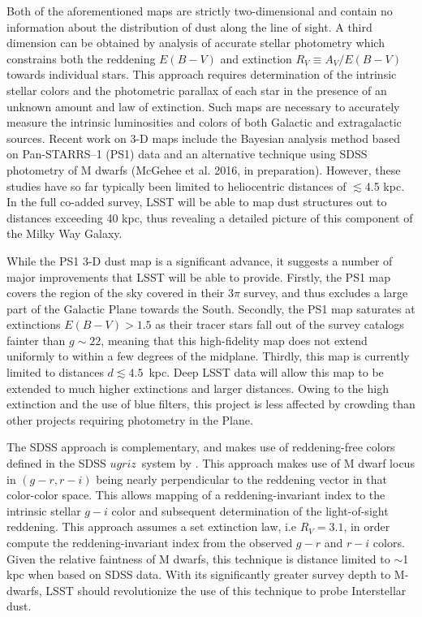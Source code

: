 Both of the aforementioned maps are strictly two-dimensional and
contain no information about the distribution of dust along the line
of sight. A third dimension can be obtained by analysis of accurate
stellar photometry which constrains both the reddening $E(B-V)$ and
extinction $R_V \equiv A_V/E(B-V)$ towards individual stars. This
approach requires determination of the intrinsic stellar colors and
the photometric parallax of each star in the presence of an unknown
amount and law of extinction. Such maps are necessary to accurately
measure the intrinsic luminosities and colors of both Galactic and
extragalactic sources. Recent work on 3-D maps include the
  Bayesian analysis method based on Pan-STARRS--1 (PS1) data 
  \citep{green15} and an alternative technique using SDSS
  photometry of M dwarfs (McGehee et al. 2016, in
  preparation). However, these studies have so far typically been
  limited to heliocentric distances of $\lesssim$4.5 kpc. In the full
  co-added survey, LSST will be able to map dust structures out to
  distances exceeding 40 kpc, thus revealing a detailed picture of
  this component of the Milky Way Galaxy.

While the PS1 3-D dust map is a significant advance, it suggests a
number of major improvements that LSST will be able to
provide. Firstly, the PS1 map covers the region of the sky covered in
their 3$\pi$ survey, and thus excludes a large part of the Galactic
Plane towards the South. Secondly, the PS1 map \citep{2014ApJ...789...15S}
saturates at extinctions $E(B-V) > 1.5$ as their tracer stars fall out
of the survey catalogs fainter than $g\sim 22$, meaning that this
high-fidelity map does not extend uniformly to within a few degrees of
the midplane. Thirdly, this map is currently limited to distances $d
\lesssim 4.5$~kpc. Deep LSST data will allow this map to be extended
to much higher extinctions and larger distances. Owing to the high
extinction and the use of blue filters, this project is less affected
by crowding than other projects requiring photometry in the Plane.

The SDSS approach is complementary, and makes use of reddening-free
colors defined in the SDSS $ugriz$~system by \citet{mcgehee05}.
This approach makes use of M dwarf locus in $(g-r,r-i)$
being nearly perpendicular to the reddening vector in that color-color
space. This allows mapping of a reddening-invariant index to the
intrinsic stellar $g-i$ color and subsequent determination of the
light-of-sight reddening. This approach assumes a set extinction law,
i.e $R_V = 3.1$, in order compute the reddening-invariant index from
the observed $g-r$ and $r-i$ colors. Given the relative faintness of M
dwarfs, this technique is distance limited to $\sim$1 kpc when based
on SDSS data. With its significantly greater survey depth to M-dwarfs,
LSST should revolutionize the use of this technique to probe
Interstellar dust.


